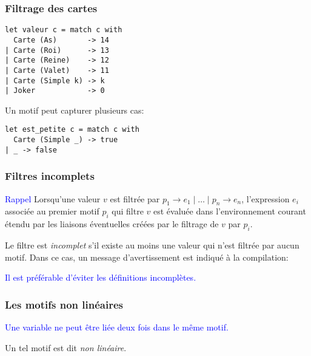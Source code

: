 %
\begin{frame}[containsverbatim]
\frametitle{Filtrage des cartes}

{\small
\begin{verbatim}
let valeur c = match c with
  Carte (As)       -> 14
| Carte (Roi)      -> 13
| Carte (Reine)    -> 12
| Carte (Valet)    -> 11
| Carte (Simple k) -> k
| Joker            -> 0
\end{verbatim}
}

\bigskip

Un motif peut capturer plusieurs cas:
{\small
\begin{verbatim}
let est_petite c = match c with
  Carte (Simple _) -> true
| _ -> false
\end{verbatim}
}

\end{frame}

%
\begin{frame}
\frametitle{Filtres incomplets}

\textcolor{blue}{Rappel} Lorsqu'une valeur $v$ est filtrée par $p_1
\rightarrow e_1 \mid \ldots \mid p_n \rightarrow e_n$, l'expression
$e_i$ associée au premier motif $p_i$ qui filtre $v$ est évaluée dans
l'environnement courant étendu par les liaisons éventuelles créées par
le filtrage de $v$ par $p_i$.

\bigskip

Le filtre est \emph{incomplet} s'il existe au moins une valeur qui n'est
filtrée par aucun motif. Dans ce cas, un message d'avertissement est
indiqué à la compilation:






\textcolor{blue}{Il est préférable d'éviter les définitions incomplètes.}

\end{frame}

%
\begin{frame}
\frametitle{Les motifs non linéaires}

\textcolor{blue}{Une variable ne peut être liée deux fois dans le même
  motif.}

\bigskip




\bigskip

Un tel motif est dit \emph{non linéaire}.

\end{frame}

